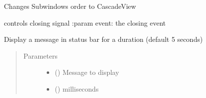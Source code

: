 \documentclass[letterpaper,10pt,english]{sphinxmanual}
\begin{document}
\begin{fulllineitems}
\begin{fulllineitems}
\begin{quote}
\begin{description}
\end{description}\end{quote}

\end{fulllineitems}


\begin{fulllineitems}
\label{\detokenize{api:beamon.ui.main.Main.cascadeView}}
Changes Subwindows order to CascadeView

\end{fulllineitems}


\begin{fulllineitems}
\label{\detokenize{api:beamon.ui.main.Main.closeEvent}}
controls closing signal
:param event: the closing event

\end{fulllineitems}


\begin{fulllineitems}
\label{\detokenize{api:beamon.ui.main.Main.display_message}}
Display a message in status bar for a duration (default 5 seconds)
\begin{quote}\begin{description}
\item[{Parameters}] \leavevmode\begin{itemize}
\item {} 
 () \textendash{} Message to display

\item {} 
 () \textendash{} milliseconds

\end{itemize}


\end{description}
\end{quote}
\end{fulllineitems}
\end{fulllineitems}
\end{document}
